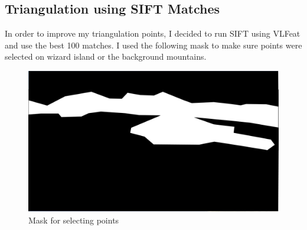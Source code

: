 \documentclass[11pt,psfig]{article}
\begin{document}
\newpage

\subsection{Triangulation using SIFT Matches}

In order to improve my triangulation points, I decided to run SIFT using VLFeat and use the best 100 matches. I used the following mask to make sure points were selected on wizard island or the background mountains. 
\begin{figure}[H]
\centering
\includegraphics[width=\columnwidth]{sfmResults1/Shot4Mask.png}
\caption{Mask for selecting points}
\end{figure}

\newpage
\end{document}
